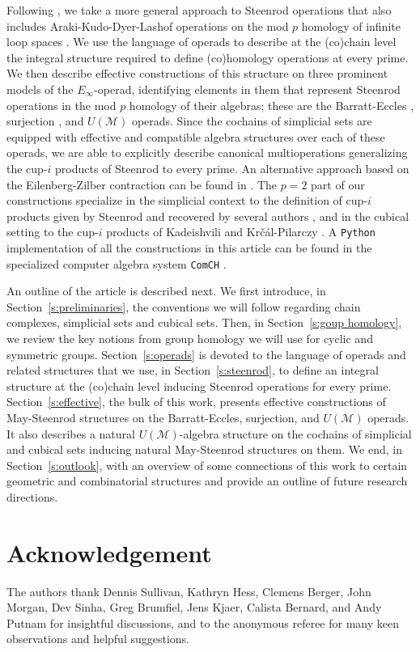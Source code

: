 Following \cite{may70generalapproach}, we take a more general approach to Steenrod operations that also includes Araki-Kudo-Dyer-Lashof operations on the mod $p$ homology of infinite loop spaces \cites{araki56squaring, dyer62lashof}. We use the language of operads \cite{may72geometry} to describe at the (co)chain level the integral structure required to define (co)homology operations at every prime. We then describe effective constructions of this structure on three prominent models of the $E_\infty$-operad, identifying elements in them that represent Steenrod operations in the mod $p$ homology of their algebras; these are the Barratt-Eccles \cite{berger04combinatorial}, surjection \cite{mcclure03cochain}, and $U(\mathcal M)$ \cite{medina2020prop1} operads. Since the cochains of simplicial sets are equipped with effective and compatible algebra structures over each of these operads, we are able to explicitly describe canonical multioperations generalizing the \mbox{cup-$i$} products of Steenrod to every prime. An alternative approach based on the Eilenberg-Zilber contraction can be found in \cite{gonzalez2005hpt}. The $p = 2$ part of our constructions specialize in the simplicial context to the definition of cup-$i$ products given by Steenrod \cite{steenrod47products} and recovered by several authors \cites{mcclure03cochain, berger04combinatorial, medina2018axiomatic}, and in the cubical setting to the cup-$i$ products of Kadeishvili \cite{kadeishvili1998dg} and Kr\v{c}\'{a}l-Pilarczy \cite{pilarczyk2016cubical}.
A \texttt{Python} implementation of all the constructions in this article can be found in the specialized computer algebra system \texttt{ComCH} \cite{medina2021computer}.

An outline of the article is described next.
We first introduce, in Section~\ref{s:preliminaries}, the conventions we will follow regarding chain complexes, simplicial sets and cubical sets.
Then, in Section~\ref{s:goup homology}, we review the key notions from group homology we will use for cyclic and symmetric groups.
Section~\ref{s:operads} is devoted to the language of operads and related structures that we use, in Section~\ref{s:steenrod}, to define an integral structure at the (co)chain level inducing Steenrod operations for every prime.
Section~\ref{s:effective}, the bulk of this work, presents effective constructions of May-Steenrod structures on the Barratt-Eccles, surjection, and $U(\mathcal M)$ operads.
It also describes a natural $U(\mathcal M)$-algebra structure on the cochains of simplicial and cubical sets inducing natural May-Steenrod structures on them.
We end, in Section~\ref{s:outlook}, with an overview of some connections of this work to certain geometric and combinatorial structures and provide an outline of future research directions.

\section*{Acknowledgement}

The authors thank Dennis Sullivan, Kathryn Hess, Clemens Berger, John Morgan, Dev Sinha, Greg Brumfiel, Jens Kjaer, Calista Bernard, and Andy Putnam for insightful discussions, and to the anonymous referee for many keen observations and helpful suggestions.